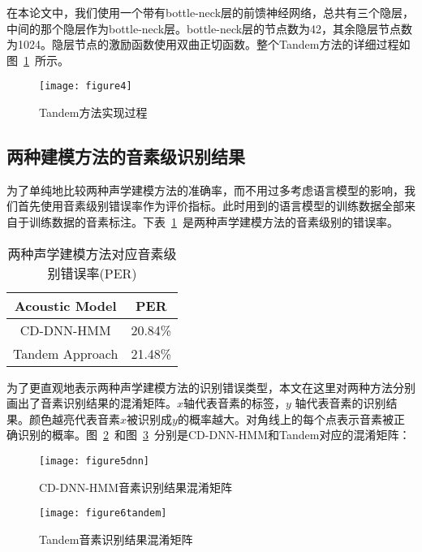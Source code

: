 在本论文中，我们使用一个带有bottle-neck层的前馈神经网络，总共有三个隐层，中间的那个隐层作为bottle-neck层。bottle-neck层的节点数为42，其余隐层节点数为1024。隐层节点的激励函数使用双曲正切函数。整个Tandem方法的详细过程如图~\ref{fig:figure4}~所示。
\begin{figure}[htbp]
\centering
\texttt{[image: figure4]}
\caption{Tandem方法实现过程}\label{fig:figure4}
\vspace{\baselineskip}
\end{figure}

\subsection{两种建模方法的音素级识别结果}
为了单纯地比较两种声学建模方法的准确率，而不用过多考虑语言模型的影响，我们首先使用音素级别错误率作为评价指标。此时用到的语言模型的训练数据全部来自于训练数据的音素标注。下表~\ref{tab:table2}~是两种声学建模方法的音素级别的错误率。
\begin{table}[htbp]
\caption{两种声学建模方法对应音素级别错误率(PER)}\label{tab:table2}
\vspace{0.5em}\centering\wuhao
\begin{tabular}{cc}
\toprule[1.5pt]
Acoustic Model & PER \\
\midrule[1pt]
 CD-DNN-HMM & 20.84\% \\
Tandem Approach & 21.48\% \\
\bottomrule[1.5pt]
\end{tabular}
\vspace{\baselineskip}
\end{table}

为了更直观地表示两种声学建模方法的识别错误类型，本文在这里对两种方法分别画出了音素识别结果的混淆矩阵。$x$轴代表音素的标签，$y$ 轴代表音素的识别结果。颜色越亮代表音素$x$被识别成$y$的概率越大。对角线上的每个点表示音素被正确识别的概率。图~\ref{fig:figure5}~和图~\ref{fig:figure6}~分别是CD-DNN-HMM和Tandem对应的混淆矩阵：
\begin{figure}[htbp]
\centering
\texttt{[image: figure5dnn]}
\caption{CD-DNN-HMM音素识别结果混淆矩阵}\label{fig:figure5}
\vspace{\baselineskip}
\end{figure}

\begin{figure}[htbp]
\centering
\texttt{[image: figure6tandem]}
\caption{Tandem音素识别结果混淆矩阵}\label{fig:figure6}
\vspace{\baselineskip}
\end{figure}

